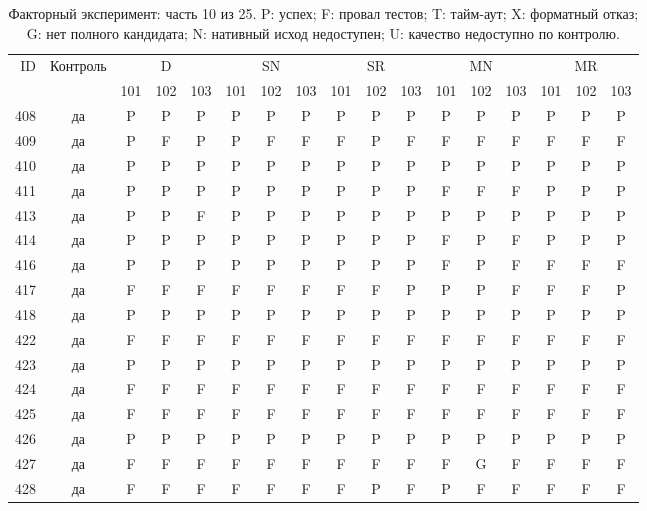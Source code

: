\begin{table}[p]\centering\footnotesize
\setlength{\tabcolsep}{3pt}
\caption{Факторный эксперимент: часть 10 из 25. P: успех; F: провал тестов; T: тайм-аут; X: форматный отказ; G: нет полного кандидата; N: нативный исход недоступен; U: качество недоступно по контролю.}
\begin{tabular*}{\textwidth}{@{\extracolsep{\fill}}rcccccccccccccccc}\toprule
ID & Контроль & \multicolumn{3}{c}{D} & \multicolumn{3}{c}{SN} & \multicolumn{3}{c}{SR} & \multicolumn{3}{c}{MN} & \multicolumn{3}{c}{MR}\\
\cmidrule(lr){3-5}\cmidrule(lr){6-8}\cmidrule(lr){9-11}\cmidrule(lr){12-14}\cmidrule(lr){15-17}
 & & 101 & 102 & 103 & 101 & 102 & 103 & 101 & 102 & 103 & 101 & 102 & 103 & 101 & 102 & 103\\\midrule
408 & да & P & P & P & P & P & P & P & P & P & P & P & P & P & P & P\\
409 & да & P & F & P & P & F & F & F & P & F & F & F & F & F & F & F\\
410 & да & P & P & P & P & P & P & P & P & P & P & P & P & P & P & P\\
411 & да & P & P & P & P & P & P & P & P & P & F & F & F & P & P & P\\
413 & да & P & P & F & P & P & P & P & P & P & P & P & P & P & P & P\\
414 & да & P & P & P & P & P & P & P & P & P & F & P & F & P & P & P\\
416 & да & P & P & P & P & P & P & P & P & P & F & P & F & F & F & F\\
417 & да & F & F & F & F & F & F & F & F & P & P & P & F & F & F & P\\
418 & да & P & P & P & P & P & P & P & P & P & P & P & P & P & P & P\\
422 & да & F & F & F & F & F & F & F & F & F & F & F & F & F & F & F\\
423 & да & P & P & P & P & P & P & P & P & P & P & P & P & P & P & P\\
424 & да & F & F & F & F & F & F & F & F & F & F & F & F & F & F & F\\
425 & да & F & F & F & F & F & F & F & F & F & F & F & F & F & F & F\\
426 & да & P & P & P & P & P & P & P & P & P & P & P & P & P & P & P\\
427 & да & F & F & F & F & F & F & F & F & F & F & G & F & F & F & F\\
428 & да & F & F & F & F & F & F & F & P & F & P & F & F & F & F & F\\

\end{tabular*}
\end{table}
